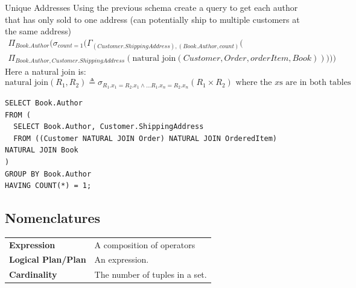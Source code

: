 \begin{examplebox}{Unique Addresses}
  Using the previous schema create a query to get each author that has only sold to one address (can potentially ship to multiple customers at the same address)
  \tcblower
  \begin{multline*}
    \Pi_{Book.Author}(
    \sigma_{count=1}(
    \Gamma_{(Customer.ShippingAddress),(Book.Author, count)}( \\
    \Pi_{Book.Author, Customer.ShippingAddress} (
    \text{natural join}(Customer, Order, orderItem, Book)
    )
    )
    )
    )
  \end{multline*}
  Here a natural join is:
  \[\text{natural join}(R_1, R_2) \triangleq \sigma_{R_1.x_1 = R_2.x_1 \land \dots R_1.x_n = R_2.x_n} (R_1 \times R_2) \text{ where the }x\text{s are in both tables}\]
  \begin{verbatim}
SELECT Book.Author
FROM (
  SELECT Book.Author, Customer.ShippingAddress
  FROM ((Customer NATURAL JOIN Order) NATURAL JOIN OrderedItem) NATURAL JOIN Book
)
GROUP BY Book.Author
HAVING COUNT(*) = 1;
  \end{verbatim}

\end{examplebox}

\subsection{Nomenclatures}
\begin{center}
  \begin{tabular}{l p{}}
    \textbf{Expression}        & A composition of operators     \\
    \textbf{Logical Plan/Plan} & An expression.                 \\
    \textbf{Cardinality}       & The number of tuples in a set. \\
  \end{tabular}
\end{center}

